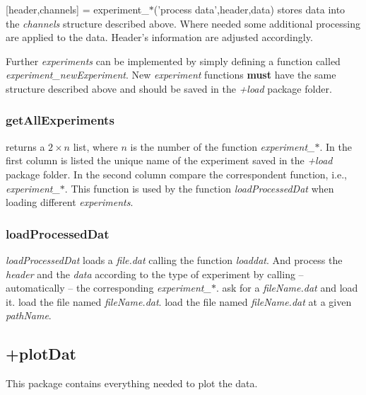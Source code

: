 \+ {[header,channels] = experiment\_$\ast$('process data',header,data)} stores data into the \emph{channels} structure described above. Where needed some additional processing are applied to the data. Header's information are adjusted accordingly.
\edf

Further \emph{experiments} can be implemented by simply defining a function called \emph{experiment\_newExperiment}. New \emph{experiment} functions \textbf{must} have the same structure described above and should be saved in the \emph{+load} package folder.

\subsubsection{getAllExperiments}
\bdf
{} returns a $2 \times n$ list, where $n$ is the number of the function \emph{experiment\_$\ast$}.
In the first column is listed the unique name of the experiment saved in the \emph{+load} package folder.
In the second column compare the correspondent function, i.e., \emph{experiment\_$\ast$}.
\edf
This function is used by the function \emph{loadProcessedDat} when loading different \emph{experiments}.

\subsubsection{loadProcessedDat}
\emph{loadProcessedDat} loads a \emph{file.dat} calling the function \emph{loaddat}.
And process the \emph{header} and the \emph{data} according to the type of experiment by calling -- automatically -- the corresponding \emph{experiment\_$\ast$}.
\bdf
{} ask for a \emph{fileName.dat} and load it.
 load the file named \emph{fileName.dat}.
 load the file named \emph{fileName.dat} at a given \emph{pathName}.
\edf

\subsection{+plotDat}
This package contains everything needed to plot the data.
